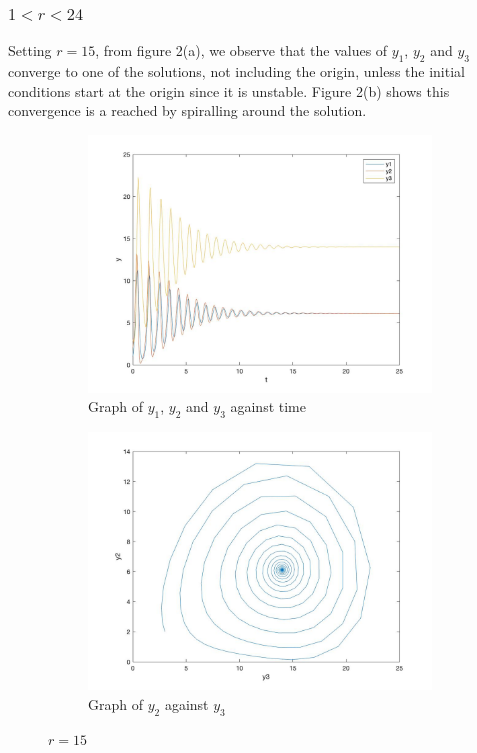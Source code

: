 \documentclass[a4paper,11pt]{article}
\begin{document}
\subsubsection{$1<r<24$}

Setting $r=15$, from figure 2(a), we observe that the values of $y_{1}$, $y_{2}$ and $y_{3}$ converge to one of the solutions, not including the origin, unless the initial conditions start at the origin since it is unstable. Figure 2(b) shows this convergence is a reached by spiralling around the solution.


\begin{figure}
     \centering
     \begin{subfigure}[b]{0.45\textwidth}
         \centering
         \includegraphics[width=\textwidth]{r15_y123_time}
         \caption{Graph of $y_{1}$, $y_{2}$ and $y_{3}$ against time}
         \label{fig:y equals x}
     \end{subfigure}
     \hfill
     \begin{subfigure}[b]{0.45\textwidth}
         \centering
         \includegraphics[width=\textwidth]{r15_y2_y3}
         \caption{Graph of $y_{2}$ against $y_{3}$}
         \label{fig:three sin x}
     \end{subfigure}
        \caption{$r=15$}
        \label{fig:r=15}
\end{figure}
\end{document}

